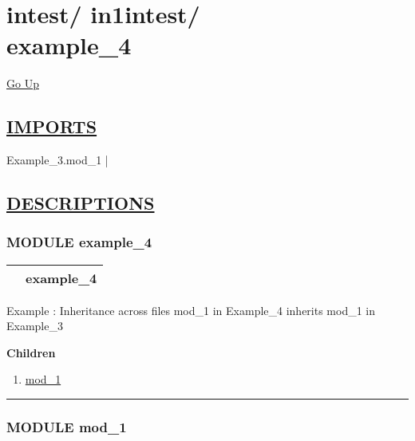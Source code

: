 \chapter*{\color{headfile}
{\large intest\slash\hspace{0pt}}
{\large in1intest\slash\hspace{0pt}}
 \\
example_4
}
\hypertarget{ecldoc:toc:intest.in1intest.example_4}{}
\hyperlink{ecldoc:toc:root/intest/in1intest}{Go Up}

\section*{\underline{\textsf{IMPORTS}}}
\begin{doublespace}
{\large
Example\_3.mod\_1 |
}
\end{doublespace}

\section*{\underline{\textsf{DESCRIPTIONS}}}
\subsection*{\textsf{\colorbox{headtoc}{\color{white} MODULE}
example\_4}}

\hypertarget{ecldoc:intest.in1intest.example_4}{}

{\renewcommand{\arraystretch}{1.5}
\begin{tabularx}{\textwidth}{|>{\raggedright\arraybackslash}l|X|}
\hline
\hspace{0pt}\mytexttt{\color{red} } & \textbf{example\_4} \\
\hline
\end{tabularx}
}

\par
Example : Inheritance across files mod\_1 in Example\_4 inherits mod\_1 in Example\_3


\textbf{Children}
\begin{enumerate}
\item \hyperlink{ecldoc:intest.in1intest.example_4.mod_1}{mod\_1}
\end{enumerate}

\rule{\linewidth}{0.5pt}

\subsection*{\textsf{\colorbox{headtoc}{\color{white} MODULE}
mod\_1}}

